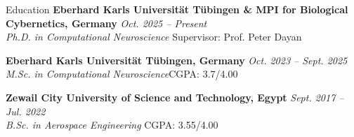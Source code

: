 \documentclass{resume} %
\begin{document}

\begin{rSection}{Education}
{\bf Eberhard Karls Universität Tübingen \& MPI for Biological Cybernetics, Germany} \hfill {\em Oct. 2025 -- Present}\\
\textit{Ph.D. in Computational Neuroscience} \hfill {Supervisor: Prof. Peter Dayan}

{\bf Eberhard Karls Universität Tübingen, Germany} \hfill {\em Oct. 2023 -- Sept. 2025} \\
\textit{M.Sc. in Computational Neuroscience}\hfill {CGPA: 3.7/4.00}

{\bf Zewail City University of Science and Technology, Egypt} \hfill {\em Sept. 2017 -- Jul. 2022} \\
\textit{B.Sc. in Aerospace Engineering} \hfill {CGPA: 3.55/4.00}

\end{rSection}

\end{document}
